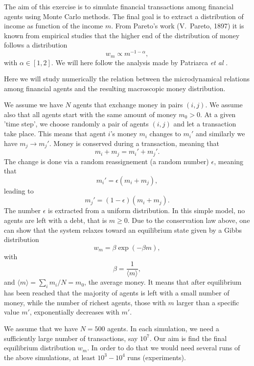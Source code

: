 \begin{prob}


The aim of this exercise is to simulate financial transactions among financial agents
using Monte Carlo methods. The final goal is to extract a distribution of income  as function
of the income $m$.   From Pareto's work (V.~Pareto, 1897) it is known from empirical studies
that the higher end of the distribution of money follows a distribution 
\[
w_m\propto m^{-1-\alpha},
\]
with $\alpha\in [1,2]$. We will here follow the analysis made by Patriarca {\em et al} \cite{patriarca2004}. 

Here we will study numerically the relation between the microdynamical 
relations among financial 
agents and the  resulting macroscopic money distribution.

We assume we have $N$ agents that exchange money in pairs $(i,j)$. We assume also that all agents
start with the same amount of money $m_0 > 0$. At a given 'time step', we choose randomly a pair
of agents $(i,j)$ and let a transaction take place. This means that agent $i$'s money $m_i$ changes
to $m_i'$ and similarly we have $m_j\rightarrow m_j'$. 
Money is conserved during a transaction, meaning that
\begin{equation}
m_i+m_j=m_i'+m_j'.
\label{eq:conserve}
\end{equation}
The change is done via a random reassignement (a random number) $\epsilon$, meaning that
\[
m_i' = \epsilon(m_i+m_j),
\]
leading to
\[
m_j'= (1-\epsilon)(m_i+m_j).
\]
The number $\epsilon$ is extracted from a uniform distribution. 
In this simple model, no agents are left with a debt, that is $m\ge 0$. 
Due to the conservation law above, one can show that the system relaxes toward an equilibrium
state given by a Gibbs distribution
\[
   w_m=\beta \exp{(-\beta m)},
\]
with 
\[
\beta = \frac{1}{\langle m\rangle},
\]
and $\langle m\rangle=\sum_i m_i/N=m_0$, the average money.
It means that after equilibrium has been reached that the majority of agents is left with a small 
number of money, while the number of richest agents, those with $m$ larger than a specific value $m'$,
exponentially decreases with $m'$. 

We assume that we have $N=500$ agents.   In each simulation, we need a sufficiently large number of transactions, say $10^7$. Our aim is find the final equilibrium distribution $w_m$. In order to do that we would need
several runs of the above simulations, at least $10^3-10^4$ runs (experiments).  



\end{prob}
